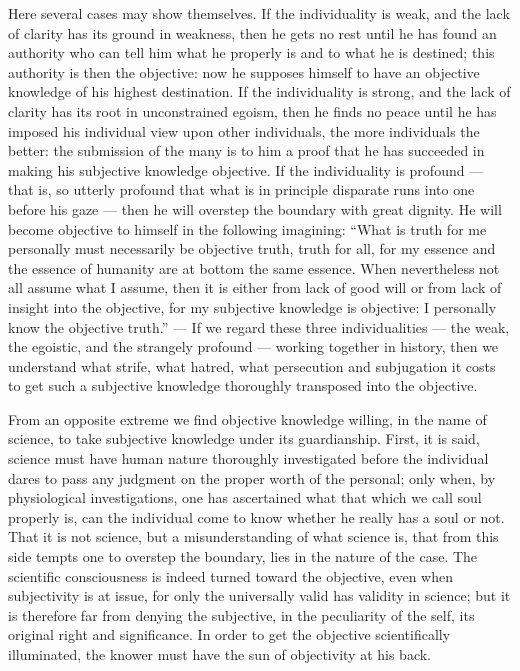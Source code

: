 \documentclass[12pt]{book}
\begin{document}
Here several cases may show themselves. If the individuality is weak, and the
lack of clarity has its ground in weakness, then he gets no rest until he has
found an authority who can tell him what he properly is and to what he is
destined; this authority is then the objective: now he supposes himself to have
an objective knowledge of his highest destination. If the individuality is
strong, and the lack of clarity has its root in unconstrained egoism, then he
finds no peace until he has imposed his individual view upon other individuals,
the more individuals the better: the submission of the many is to him a proof
that he has succeeded in making his subjective knowledge objective. If the
individuality is profound --- that is, so utterly profound that what is in
principle disparate runs into one before his gaze --- then he will overstep the
boundary with great dignity. He will become objective to himself in the
following imagining: ``What is truth for me personally must necessarily be
objective truth, truth for all, for my essence and the essence of humanity are
at bottom the same essence. When nevertheless not all assume what I assume,
then it is either from lack of good will or from lack of insight into the
objective, for my subjective knowledge is objective: I personally know the
objective truth.'' --- If we regard these three individualities --- the weak,
the egoistic, and the strangely profound --- working together in history, then
we understand what strife, what hatred, what persecution and subjugation it
costs to get such a subjective knowledge thoroughly transposed into the
objective.

From an opposite extreme we find objective knowledge willing, in the name of
science, to take subjective knowledge under its guardianship. First, it is said,
science must have human nature thoroughly investigated before the individual
dares to pass any judgment on the proper worth of the personal; only when, by
physiological investigations, one has ascertained what that which we call soul
properly is, can the individual come to know whether he really has a soul or
not. That it is not science, but a misunderstanding of what science is, that
from this side tempts one to overstep the boundary, lies in the nature of the
case. The scientific consciousness is indeed turned toward the objective, even
when subjectivity is at issue, for only the universally valid has validity in
science; but it is therefore far from denying the subjective, in the
peculiarity of the self, its original right and significance. In order to get
the objective scientifically illuminated, the knower must have the sun of
objectivity at his back.
\end{document}
